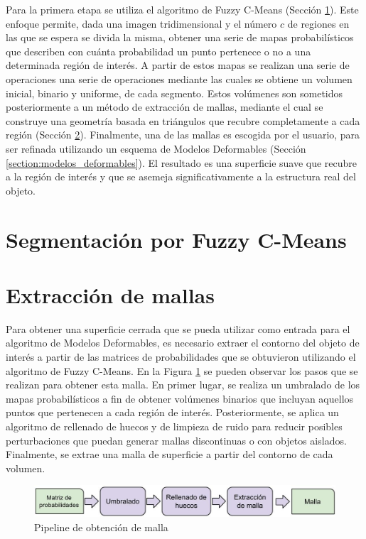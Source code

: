 Para la primera etapa se utiliza el algoritmo de Fuzzy C-Means (Sección \ref{section:segmentacion_fuzzy}). Este enfoque permite, dada una imagen tridimensional y el número $c$ de regiones en las que se espera se divida la misma, obtener una serie de mapas probabilísticos que describen con cuánta probabilidad un punto pertenece o no a una determinada región de interés. A partir de estos mapas se realizan una serie de operaciones una serie de operaciones mediante las cuales se obtiene un volumen inicial, binario y uniforme, de cada segmento. Estos volúmenes son sometidos posteriormente a un método de extracción de mallas, mediante el cual se construye una geometría basada en triángulos que recubre completamente a cada región (Sección \ref{section:extraccion_de_mallas}). Finalmente, una de las mallas es escogida por el usuario, para ser refinada utilizando un esquema de Modelos Deformables (Sección \ref{section:modelos_deformables}). El resultado es una superficie suave que recubre a la región de interés y que se asemeja significativamente a la estructura real del objeto.

\section{Segmentación por Fuzzy C-Means}\label{section:segmentacion_fuzzy}

\section{Extracción de mallas}\label{section:extraccion_de_mallas}
Para obtener una superficie cerrada que se pueda utilizar como entrada para el algoritmo de Modelos Deformables, es necesario extraer el contorno del objeto de interés a partir de las matrices de probabilidades que se obtuvieron utilizando el algoritmo de Fuzzy C-Means. En la Figura \ref{fig:pipe_obtencion_malla} se pueden observar los pasos que se realizan para obtener esta malla. En primer lugar, se realiza un umbralado de los mapas probabilísticos a fin de obtener volúmenes binarios que incluyan aquellos puntos que pertenecen a cada región de interés. Posteriormente, se aplica un algoritmo de rellenado de huecos y de limpieza de ruido para reducir posibles perturbaciones que puedan generar mallas discontinuas o con objetos aislados. Finalmente, se extrae una malla de superficie a partir del contorno de cada volumen.

\begin{figure}[H]
	\centering
	\includegraphics[scale=0.4]{images/pipeline_de_obtencion_de_malla.jpg}
	\caption{Pipeline de obtención de malla}
	\label{fig:pipe_obtencion_malla}
\end{figure}

